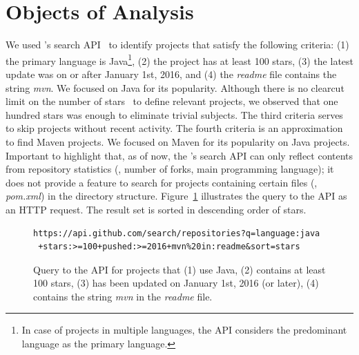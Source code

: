 \section{Objects of Analysis}
\label{sec:subjects}

We used \github{}'s search API~\cite{githubsearch} to identify
projects that satisfy the following criteria: (1) the primary language
is Java\footnote{In case of projects in multiple languages, the
  \github{} API considers the predominant language as the primary
  language.}, (2) the project has at least 100 stars, (3) the latest
update was on or after January 1st, 2016, and (4) the \emph{readme}
file contains the string \emph{mvn}.  We focused on Java for its
popularity.  Although there is no clearcut limit on the number of
\github{} stars~\cite{github-stars} to define relevant projects, we
observed that one hundred stars was enough to eliminate trivial subjects. The
third
criteria serves to skip projects without recent activity. The fourth
criteria is an approximation to find Maven projects. We focused on Maven for its popularity on
Java projects.  Important to highlight that, as of now, the
\github{}'s search API can only reflect contents from repository
statistics (\eg, number of forks, main programming language); it does
not provide a feature to search for projects containing certain files
(\eg{}, \emph{pom.xml}) in the directory structure.
Figure~\ref{fig:subject-query} illustrates the query to the \github{}
API as an HTTP request.   The result set is sorted
in descending order of stars.

\begin{figure}[t!]
\centering
\tiny
{}
\begin{lstlisting}
https://api.github.com/search/repositories?q=language:java
 +stars:>=100+pushed:>=2016+mvn%20in:readme&sort=stars
\end{lstlisting}
  \vspace{-3mm}
  \caption{\label{fig:subject-query} Query to the \github{} API for
  projects that (1) use Java, (2) contains at least 100
  stars, (3) has been updated on January 1st, 2016 (or later), (4) contains
  the string \emph{mvn} in the \emph{readme} file.}
  \vspace{-3mm}
\end{figure}

